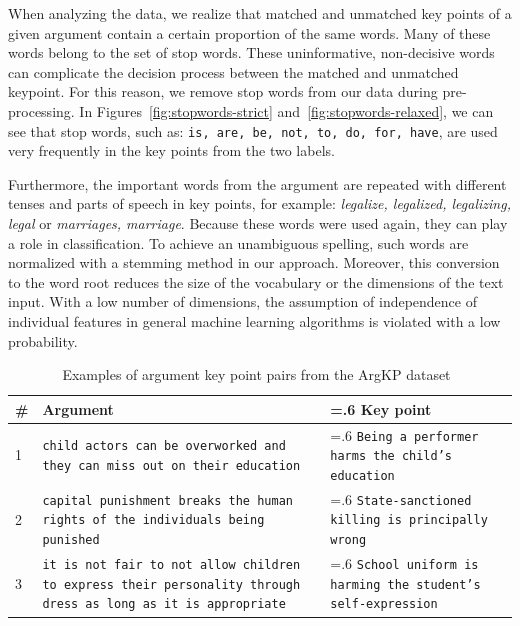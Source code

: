 When analyzing the data, we realize that matched and unmatched key points of a given argument contain a certain proportion of the same words. 
Many of these words belong to the set of stop words. 
These uninformative, non-decisive words can complicate the decision process between the matched and unmatched keypoint. 
For this reason, we remove stop words from our data during pre-processing. 
In Figures~\ref{fig:stopwords-strict} and~\ref{fig:stopwords-relaxed}, we can see that stop words, such as: \texttt{is, are, be, not, to, do, for, have}, are used very frequently in the key points from the two labels. 

Furthermore, the important words from the argument are repeated with different tenses and parts of speech in key points, for example: \textit{legalize, legalized, legalizing, legal} or \textit{marriages, marriage}.
Because these words were used again, they can play a role in classification. 
To achieve an unambiguous spelling, such words are normalized with a stemming method in our approach. 
Moreover, this conversion to the word root reduces the size of the vocabulary or the dimensions of the text input. 
With a low number of dimensions, the assumption of independence of individual features in general machine learning algorithms is violated with a low probability. 

\begin{table}
  \caption{Examples of argument key point pairs from the ArgKP dataset~\cite{Bar-HaimEFKLS2020}}
  \label{tab:data-example}
  \begin{tabularx}{\linewidth}{lX>{\hsize=.6\hsize}X}
    \toprule
    \textbf{\#} & \textbf{Argument} & \textbf{Key point} \\
    \midrule
    1 & \texttt{child actors can be overworked and they can miss out on their education} & \texttt{Being a performer harms the child's education} \\
    2 & \texttt{capital punishment breaks the human rights of the individuals being punished} & \texttt{State-sanctioned killing is principally wrong} \\
    3 & \texttt{it is not fair to not allow children to express their personality through dress as long as it is appropriate} & \texttt{School uniform is harming the student's self-expression}
  \end{tabularx}
\end{table}

